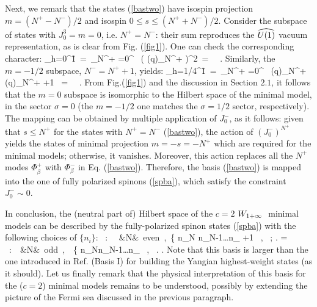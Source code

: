 Next, we remark that the states (\ref{bastwo}) have isospin
projection $m=(N^+ -N^-)/2$ and isospin $0\le s \le (N^+ + N^-)/2$.
Consider the subspace of states with $J^3_0=m=0$,
i.e. $N^+ = N^-$: their sum reproduces the $\u1$ vacuum 
representation, as is clear from Fig. (\ref{fig1}).
One can check the corresponding character:
\beq
\chi_{h=0}^{\u1}\ =\ \sum_{N^+ =0}^{\infty}\ 
{\left( \left(q\right)_{N^+} \right)^2}\ =\
 \ .
\eeq
Similarly, the $m=-1/2$ subspace, $N^- = N^+ +1$, yields:
\beq
\chi_{h=1/4}^{\u1}\ =\ \sum_{N^+ =0}^{\infty}\ 
{\left(q\right)_{N^+}\left(q\right)_{N^+ +1} }\ =\
 \ .
\eeq
{}From Fig.(\ref{fig1}) and the discussion in Section $2.1$, it follows
that the $m=0$ subspace is isomorphic to the Hilbert space 
of the minimal model, in the sector $\sigma=0$ (the $m=-1/2$
one matches the $\sigma=1/2$ sector, respectively). 
The mapping can be obtained by multiple application of $J^-_0$, as it follows: 
given that $s\leq N^+$ for the states with $N^+ = N^-$ (\ref{bastwo}),
the action of $\left( J^-_0 \right)^{N^+}$ yields the states
of minimal projection $m=-s=-N^+$ which are required for the minimal models;
otherwise, it vanishes.
Moreover, this action replaces all the $N^+$ modes $\Phi^+_{\beta}$ with 
$\Phi^-_{\beta}$ in Eq. (\ref{bastwo}). Therefore, the basis 
(\ref{bastwo}) is mapped into the one of fully
polarized spinons (\ref{spba}), which satisfy the constraint 
$J^-_0 \sim 0$.

In conclusion, the (neutral part of) Hilbert space of the 
$c=2$ $W_{1+\infty}\ $ minimal models can be described
by the fully-polarized spinon states (\ref{spba}) with the 
following choices of $\{ n_i \}$:
\barr
{}\ : \ \ &N&\ {\rm even}\ ,\ 
\left\{ { {n_N \geq n_{N-1}\geq\dots\geq n_{ +1} }\ ,
\atop {n_{\frac{N}{2}-1}\geq n_{\frac{N}{2}-2}\geq\dots\geq n_1 
\geq 0} \ ;} \right. \nl
\sigma = \frac{1}{2}\ :\ \ &N&\ {\rm odd}\ ,\ \  
\left\{ { {n_N\geq n_{N-1}\geq\dots\geq n_{} }\ , 
\atop {n_{\frac{N-1}{2}} \geq n_{\frac{N-1}{2}-1}\geq\dots\geq n_1 
\geq 0} \ .} \right.
\earr
Note that this basis is larger than the one introduced in Ref. \cite{bls}
(Basis I) for building the Yangian highest-weight states (as it should).
Let us finally remark that the physical interpretation of this
basis for the ($c=2$) minimal models remains to be understood,
possibly by extending the picture of the Fermi sea 
discussed in the previous paragraph.   
 

